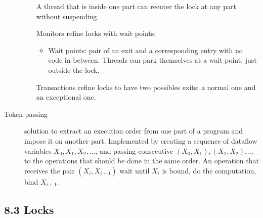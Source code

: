 \begin{description}
\begin{enumerate}
        A thread that is inside one part can reenter the lock at any part without suspending.
      \item[Monitors] refine locks with wait points.
        \begin{itemize}
          \item Wait points: pair of an exit and a corresponding entry with no code in between.
            Threads can park themselves at a wait point, just outside the lock.
        \end{itemize}
      \item[Transactions] refine locks to have two possibles exits: a normal one and an exceptional one.
    \end{enumerate}
  \item[Token passing] solution to extract an execution order from one part of a program and impose it on another part.
    Implemented by creating a sequence of dataflow variables $X_0, X_1, X_2, \ldots$, and passing consecutive $(X_0, X_1), (X_1, X_2), \ldots$ to the operations that should be done in the same order.
    An operation that receives the pair $(X_i, X_{i+1})$ wait until $X_i$ is bound, do the computation, bind $X_{i+1}$.
\end{description}


\subsection{8.3 Locks}

